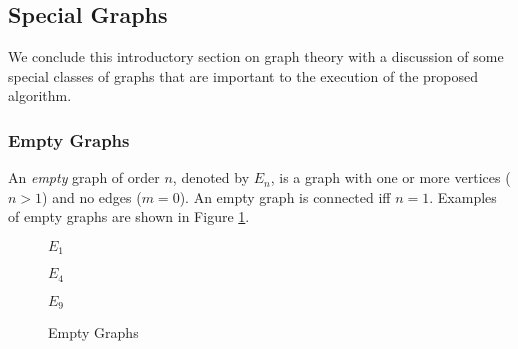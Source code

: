 \subsection{Special Graphs}

We conclude this introductory section on graph theory with a discussion of some special classes of graphs that are
important to the execution of the proposed algorithm.

\subsubsection{Empty Graphs}

An \emph{empty} graph of order \(n\), denoted by \(E_n\), is a graph with one or more vertices (\(n>1\)) and no
edges (\(m=0\)).  An empty graph is connected iff \(n=1\).  Examples of empty graphs are shown in Figure
\ref{fig:empty}.

\begin{figure}[h]
  \label{fig:empty}
  \begin{minipage}{1.5in}
    \begin{center}

      \bigskip

      \(E_1\)
    \end{center}
  \end{minipage}
  \begin{minipage}{2.5in}
    \begin{center}

      \bigskip

      \(E_4\)
    \end{center}
  \end{minipage}
  \begin{minipage}{2in}
    \begin{center}

      \bigskip

      \(E_9\)
    \end{center}
  \end{minipage}
  \caption{Empty Graphs}
\end{figure}

